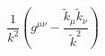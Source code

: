 \begin{equation}
\frac{1}{k^2}(g^{\mu \nu}- \frac{\tilde{k}_{\mu} 
\tilde{k}_{\nu}}{\tilde{k}^2})
 \label{19}
 \end{equation}

